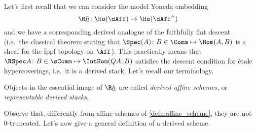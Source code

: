         Let's first recall that we can consider the model Yoneda embedding \[\R\underline{h}\colon \Ho(\dAff) \to \Ho(\dAff^{\wedge}) \] and we have a corresponding derived analogue of the faithfully flat descent (i.e.\ the classical theorem stating that $\Spec(A)\colon B \in \Comm \mapsto \Hom(A, B)$ is a sheaf for the fppf topology on $\Aff$). This practically means that $\RSpec A\colon B \in \sComm \mapsto \IntHom(QA, B)$ satisfies the descent condition for étale hypercoverings, i.e.\ it is a derived stack. 
        Let's recall our terminology.
        \begin{defn}
            \label{defn:derived_representable_stacks}
            Objects in the essential image of $\R\underline{h}$ are called \emph{derived affine schemes}, or \emph{representable derived stacks}.
        \end{defn}
        Observe that, differently from affine schemes of \cref{defn:affine_scheme}, they are not $0$-truncated.
        Let's now give a general definition of a derived scheme.

